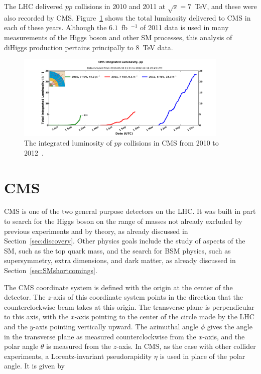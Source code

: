 The LHC delivered $pp$ collisions in 2010 and 2011 at $\sqrt{s} = 7$~TeV,
and these were also recorded by CMS.
Figure~\ref{fig:intlumi101112} shows the total luminosity delivered to CMS in each of these years.
Although the $6.1$~fb~$^{-1}$ of 2011 data is used in many measurements of the Higgs boson and
other SM processes, this analysis of diHiggs production pertains principally to 8~TeV data.

\begin{figure}[ht]
 \begin{center}
    \includegraphics[width=0.90\textwidth]{figures/experiment/int_lumi_cumulative_pp_1.pdf}
      \end{center}
\caption{The integrated luminosity of $pp$ collisions in CMS from 2010 to 2012~\cite{CMS:lumi}.}
\label{fig:intlumi101112}
\end{figure}


\section{CMS\label{sec:CMS}}

CMS is one of the two general purpose detectors on the LHC. It was built in part
to search for the Higgs boson on the range of masses not already excluded by previous experiments
and by theory, as already discussed in Section~\ref{sec:discovery}. Other physics goals include
the study of aspects of the SM, such as the top quark mass, and the search for BSM physics, such
as supersymmetry, extra dimensions, and dark matter, as already discussed in
Section~\ref{sec:SMshortcomings}.

The CMS coordinate system is defined with the origin at the center of the detector. The $z$-axis
of this coordinate system points in the direction that the counterclockwise beam takes at this origin.
The transverse plane is perpendicular to this axis, with the $x$-axis pointing to the center of the
circle made by the LHC and the $y$-axis pointing vertically upward. The azimuthal angle $\phi$ gives
the angle in the transverse plane as measured counterclockwise from the $x$-axis, and the polar angle
$\theta$ is measured from the $z$-axis. In CMS, as the case with other collider experiments,
a Lorentz-invariant pseudorapidity $\eta$ is used in place of the polar angle. It is given by


